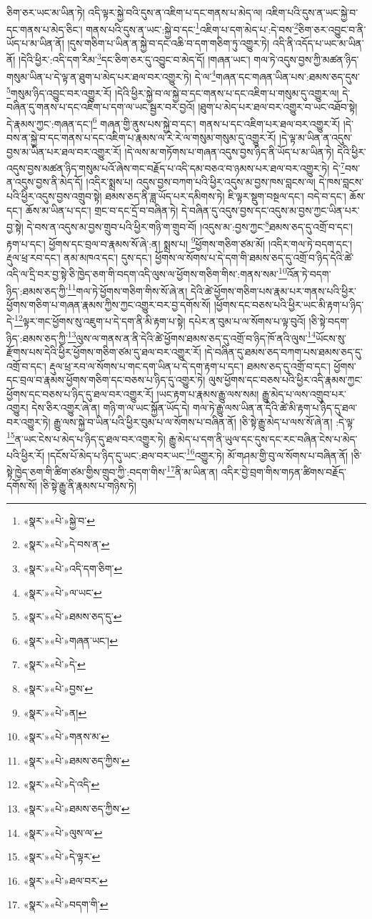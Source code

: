 ཅིག་ཅར་ཡང་མ་ཡིན་ཏེ། འདི་ལྟར་སྐྱེ་བའི་དུས་ན་འཇིག་པ་དང་གནས་པ་མེད་ལ། འཇིག་པའི་དུས་ན་ཡང་སྐྱེ་བ་དང་གནས་པ་མེད་ཅིང་། གནས་པའི་དུས་ན་ཡང་:སྐྱེ་བ་དང་\footnote{«སྣར་»«པེ་»སྐྱེ་བ་}འཇིག་པ་དག་མེད་པ་:དེ་བས་\footnote{«སྣར་»«པེ་»དེ་བས་ན་}ཅིག་ཅར་འབྱུང་བ་ནི་ཡོད་པ་མ་ཡིན་ནོ། །དུས་གཅིག་པ་ཡིན་ན་སྐྱེ་བ་དང་འཆི་བ་དག་གཅིག་ཏུ་འགྱུར་ཏེ། འདི་ནི་འདོད་པ་ཡང་མ་ཡིན་ནོ། །དེའི་ཕྱིར་:འདི་དག་རིམ་\footnote{«སྣར་»«པེ་»འདི་དག་ཅིག་}དང་ཅིག་ཅར་དུ་འབྱུང་བ་མེད་དོ། །གཞན་ཡང་། གལ་ཏེ་འདུས་བྱས་ཀྱི་མཚན་ཉིད་གསུམ་ཡིན་པ་དེ་ལྟ་ན་ཐུག་པ་མེད་པར་ཐལ་བར་འགྱུར་ཏེ། དེ་ལ་\footnote{«སྣར་»«པེ་»ལ་ཡང་}གཞན་དང་གཞན་ཡིན་པས་:ཐམས་ཅད་དུས་\footnote{«སྣར་»«པེ་»ཐམས་ཅད་དུ་}གསུམ་ཉིད་འབྱུང་བར་འགྱུར་རོ། །དེའི་ཕྱིར་སྐྱེ་བ་ལ་སྐྱེ་བ་དང་གནས་པ་དང་འཇིག་པ་གསུམ་དུ་འགྱུར་ལ། དེ་བཞིན་དུ་གནས་པ་དང་འཇིག་པ་དག་ལ་ཡང་སྦྱར་བར་བྱའོ། །ཐུག་པ་མེད་པར་ཐལ་བར་འགྱུར་བ་ཡང་འཐོབ་སྟེ། དེ་རྣམས་ཀྱང་:གཞན་དང་།\footnote{«སྣར་»«པེ་»གཞན་ཡང་།} གཞན་གྱི་ནུས་པས་སྐྱེ་བ་དང་། གནས་པ་དང་འཇིག་པར་ཐལ་བར་འགྱུར་རོ། །དེ་བས་ན་སྐྱེ་བ་དང་གནས་པ་དང་འཇིག་པ་རྣམས་ལ་རེ་རེ་ལ་གསུམ་གསུམ་དུ་འགྱུར་རོ། །དེ་ལྟ་མ་ཡིན་ན་འདུས་བྱས་མ་ཡིན་པར་ཐལ་བར་འགྱུར་རོ། །དེ་ལས་མ་གཏོགས་པ་གཞན་འདུས་བྱས་ཉིད་ནི་ཡོད་པ་མ་ཡིན་ཏེ། དེའི་ཕྱིར་འདུས་བྱས་མཚན་ཉིད་གསུམ་པའོ་ཞེས་གང་བརྗོད་པ་འདི་དམ་བཅའ་བ་ཉམས་པར་ཐལ་བར་འགྱུར་ཏེ། དེ་\footnote{«སྣར་»«པེ་»དེ་}བས་ན་འདུས་བྱས་ནི་མེད་དོ། །འདིར་སྨྲས་པ། འདུས་བྱས་བཀག་པའི་ཕྱིར་འདུས་མ་བྱས་ཁས་བླངས་ལ། དེ་ཁས་བླངས་པའི་ཕྱིར་འདུས་བྱས་འགྲུབ་སྟེ། ཐམས་ཅད་ནི་ཟླ་ཡོད་པར་དམིགས་ཏེ། ཇི་ལྟར་སྡུག་བསྔལ་དང་། བདེ་བ་དང་། ཆོས་དང་། ཆོས་མ་ཡིན་པ་དང་། གྲང་བ་དང་དྲོ་བ་བཞིན་ཏེ། དེ་བཞིན་དུ་འདུས་བྱས་དང་འདུས་མ་བྱས་ཀྱང་ཡིན་པར་བྱ་སྟེ། དེ་བས་ན་འདུས་མ་བྱས་གྲུབ་པའི་ཕྱིར་གཉི་ག་གྲུབ་བོ། །འདུས་མ་:བྱས་ཀྱང་\footnote{«སྣར་»«པེ་»བྱས་}ཐམས་ཅད་དུ་འགྲོ་བ་དང་། རྟག་པ་དང་། ཕྱོགས་དང་བྲལ་བ་རྣམས་སོ་ཞེ་:ན། སྨྲས་པ། \footnote{«སྣར་»«པེ་»ན།  }ཕྱོགས་གཅིག་ཙམ་མོ། །འདིར་གལ་ཏེ་བདག་དང་། རྡུལ་ཕྲ་རབ་དང་། ནམ་མཁའ་དང་། དུས་དང་། ཕྱོགས་ལ་སོགས་པ་དེ་དག་གི་ཐམས་ཅད་དུ་འགྲོ་བ་ཉིད་དེའི་ཚེ་འདི་ལ་དྲི་བར་བྱ་སྟེ་ཅི་ཁྱེད་ཅག་གི་བདག་འདི་ལུས་ལ་ཕྱོགས་གཅིག་གིས་:གནས་སམ་\footnote{«སྣར་»«པེ་»གནས་མ་}འོན་ཏེ་བདག་ཉིད་:ཐམས་ཅད་ཀྱི་\footnote{«སྣར་»«པེ་»ཐམས་ཅད་ཀྱིས་}གལ་ཏེ་ཕྱོགས་གཅིག་གིས་སོ་ཞེ་ན། དེའི་ཚེ་ཕྱོགས་གཅིག་པས་རྣམ་པར་གནས་པའི་ཕྱིར་ཕྱོགས་གཅིག་པ་གཞན་རྣམས་ཀྱིས་ཀྱང་འགྱུར་བར་བྱ་དགོས་སོ། །ཕྱོགས་དང་བཅས་པའི་ཕྱིར་ཡང་མི་རྟག་པ་ཉིད་དེ་\footnote{«སྣར་»«པེ་»དེ་འདི་}ལྟར་གང་ཕྱོགས་སུ་འཇུག་པ་དེ་དག་ནི་མི་རྟག་པ་སྟེ། དཔེར་ན་བུམ་པ་ལ་སོགས་པ་ལྟ་བུའོ། །ཅི་སྟེ་བདག་ཉིད་:ཐམས་ཅད་ཀྱི་\footnote{«སྣར་»«པེ་»ཐམས་ཅད་ཀྱིས་}ལུས་ལ་གནས་ན་ནི་དེའི་ཚེ་ཕྱོགས་ཐམས་ཅད་དུ་འགྲོ་བ་ཉིད་ཁོ་ནའི་ལུས་\footnote{«སྣར་»«པེ་»ལུས་ལ་}ཡོངས་སུ་རྫོགས་པས་དེའི་ཕྱིར་ཕྱོགས་གཅིག་ཙམ་དུ་ཐལ་བར་འགྱུར་རོ། །དེ་བཞིན་དུ་ཐམས་ཅད་བཀག་པས་ཐམས་ཅད་དུ་འགྲོ་བ་དང་། རྡུལ་ཕྲ་རབ་ལ་སོགས་པ་གང་དག་ཡིན་པ་དེ་དག་རྟག་པ་དང་། ཐམས་ཅད་དུ་འགྲོ་བ་དང་། ཕྱོགས་དང་བྲལ་བ་རྣམས་ཕྱོགས་གཅིག་དང་བཅས་པ་ཉིད་དུ་འགྱུར་ཏེ། ལུས་ཕྱོགས་དང་བཅས་པའི་ཕྱིར་འདི་རྣམས་ཀྱང་ཕྱོགས་དང་བཅས་པ་ཉིད་དུ་ཐལ་བར་འགྱུར་རོ། །ཡང་རྟག་པ་རྣམས་རྒྱུ་ལས་སམ། རྒྱུ་མེད་པ་ལས་འགྲུབ་པར་འགྱུར། དེས་ཅིར་འགྱུར་ཞེ་ན། གཉི་ག་ལ་ཡང་སྐྱོན་ཡོད་དེ། གལ་ཏེ་རྒྱུ་ལས་ཡིན་ན་དེའི་ཚེ་མི་རྟག་པ་ཉིད་དུ་ཐལ་བར་འགྱུར་ཏེ། རྒྱུ་ལས་སྐྱེ་བ་ཡིན་པའི་ཕྱིར་བུམ་པ་ལ་སོགས་པ་བཞིན་ནོ། །ཅི་སྟེ་རྒྱུ་མེད་པ་ལས་སོ་ཞེ་ན། :དེ་ལྟ་\footnote{«སྣར་»«པེ་»དེ་ལྟར་}ན་ཡང་ངེས་པ་མེད་པ་ཉིད་དུ་ཐལ་བར་འགྱུར་ཏེ། རྒྱུ་མེད་པ་དག་ནི་ཡུལ་དང་དུས་དང་རང་བཞིན་ངེས་པ་མེད་པའི་ཕྱིར་རོ། །དངོས་པོ་མེད་པ་ཉིད་དུ་ཡང་:ཐལ་བར་ཡང་\footnote{«སྣར་»«པེ་»ཐལ་བར་}འགྱུར་ཏེ། མོ་གཤམ་གྱི་བུ་ལ་སོགས་པ་བཞིན་ནོ། །ཅི་སྟེ་ཁྱེད་ཅག་གི་ཚིག་ཙམ་གྱིས་གྲུབ་ཀྱི་:བདག་གིས་\footnote{«སྣར་»«པེ་»བདག་གི་}ནི་མ་ཡིན་ན། འདིར་བྱེ་བྲག་གིས་གཏན་ཚིགས་བརྗོད་དགོས་སོ། །ཅི་སྟེ་རྒྱུ་ནི་རྣམས་པ་གཉིས་ཏེ། 